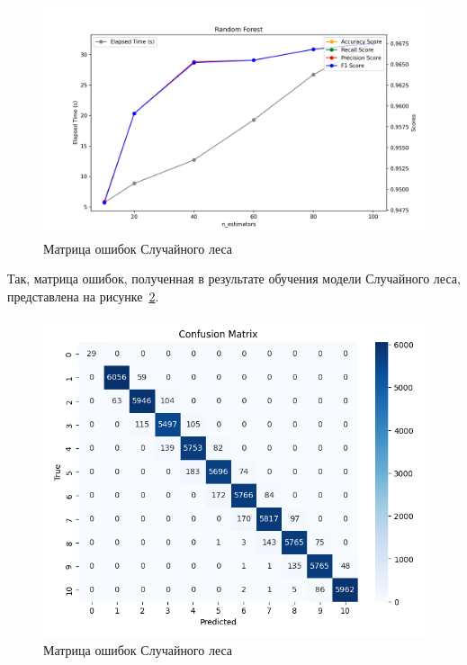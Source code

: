 \begin{center}
    \begin{figure}[H]
        \includegraphics[scale=0.6]{pic/statistic/random_forest.png}
        \caption{Матрица ошибок Случайного леса}
        \label{ris:graph-forest}
    \end{figure}
\end{center}

Так, матрица ошибок, полученная в результате обучения модели Случайного леса, представлена на рисунке~\ref{ris:matrix-forest}.

\begin{center}
    \begin{figure}[H]
        \includegraphics[scale=0.6]{pic/classification/random_forest.png}
        \caption{Матрица ошибок Случайного леса}
        \label{ris:matrix-forest}
    \end{figure}
\end{center}
\vspace{1.5em}

